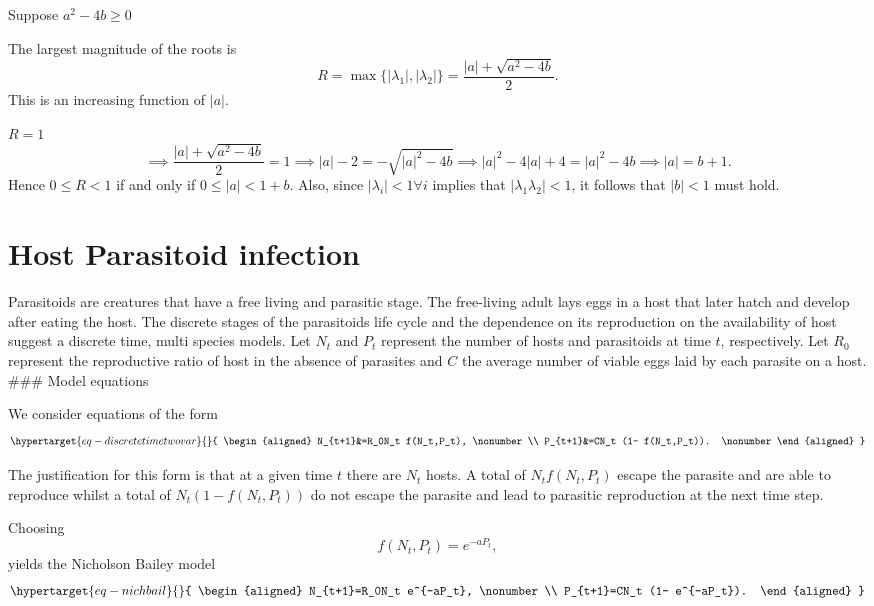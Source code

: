 \documentclass[
  letterpaper,
  DIV=11,
  numbers=noendperiod]{scrreprt}
\begin{document}
Suppose \(a^2-4b\geq 0\)

The largest magnitude of the roots is \[
R=\max\{|\lambda_1|,|\lambda_2|\} =  \frac{|a| + \sqrt{a^2-4b}}{2}.
\] This is an increasing function of \(|a|\).

\(R=1\) \[
\implies  \frac{|a| + \sqrt{a^2-4b}}{2}=1
\implies |a|-2=-\sqrt{|a|^2-4b}
\implies |a|^2-4|a|+4=|a|^2-4b 
\implies |a|=b+1.
\] Hence \(0\leq R < 1\) if and only if \(0\leq |a|<1+b\). Also, since
\(|\lambda_i|<1 \forall i\) implies that \(|\lambda_1\lambda_2|<1\), it
follows that \(|b|<1\) must hold.

\hypertarget{host-parasitoid-infection}{%
\section{Host Parasitoid infection}\label{host-parasitoid-infection}}

Parasitoids are creatures that have a free living and parasitic stage.
The free-living adult lays eggs in a host that later hatch and develop
after eating the host. The discrete stages of the parasitoids life cycle
and the dependence on its reproduction on the availability of host
suggest a discrete time, multi species models. Let \(N_{t}\) and \(P_t\)
represent the number of hosts and parasitoids at time \(t\),
respectively. Let \(R_0\) represent the reproductive ratio of host in
the absence of parasites and \(C\) the average number of viable eggs
laid by each parasite on a host. \#\#\# Model equations

We consider equations of the form
\begin{equation}\protect\hypertarget{eq-discretetimetwovar}{}{
\begin{aligned}
N_{t+1}&=R_0N_t f(N_t,P_t), \nonumber \\
P_{t+1}&=CN_t (1- f(N_t,P_t)). \nonumber
\end{aligned}
}\label{eq-discretetimetwovar}\end{equation}

The justification for this form is that at a given time \(t\) there are
\(N_t\) hosts. A total of \(N_t f(N_t,P_t)\) escape the parasite and are
able to reproduce whilst a total of \(N_t(1-f(N_t,P_t))\) do not escape
the parasite and lead to parasitic reproduction at the next time step.

Choosing \[
f(N_t,P_t)=e^{-aP_t},
\] yields the Nicholson Bailey model
\begin{equation}\protect\hypertarget{eq-nichbail}{}{
\begin{aligned}
N_{t+1}=R_0N_t e^{-aP_t}, \nonumber \\
P_{t+1}=CN_t (1- e^{-aP_t}). 
\end{aligned}
}\label{eq-nichbail}\end{equation}
\end{document}
